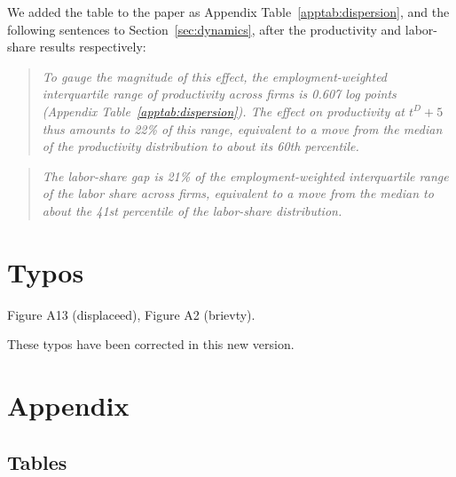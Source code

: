 \documentclass[11pt]{article}
\newcommand{\answer}[1]{\begingroup\color{navy}#1\endgroup}
\begin{document}
\begin{enumerate}[leftmargin=*]
{We added the table to the paper as Appendix Table~\ref{apptab:dispersion}, and the following sentences to Section~\ref{sec:dynamics}, after the productivity and labor-share results respectively:
\begin{quote}\itshape
To gauge the magnitude of this effect, the employment-weighted interquartile range of productivity across firms is 0.607 log points (Appendix Table~\ref{apptab:dispersion}). The effect on productivity at $t^D+5$ thus amounts to 22\% of this range, equivalent to a move from the median of the productivity distribution to about its 60th percentile.
\end{quote}
\begin{quote}\itshape
The labor-share gap is 21\% of the employment-weighted interquartile range of the labor share across firms, equivalent to a move from the median to about the 41st percentile of the labor-share distribution.
\end{quote}
}\par


\end{enumerate}

\section*{Typos}

Figure A13 (displaceed), Figure A2 (brievty).\\
\par

\answer{These typos have been corrected in this new version.}



%


\clearpage
\appendix
\setcounter{table}{0}
\setcounter{figure}{0}
\renewcommand{\thetable}{R\arabic{table}}
\renewcommand{\thefigure}{R\arabic{figure}}

\section*{Appendix}

\subsection*{Tables}
\end{document}
